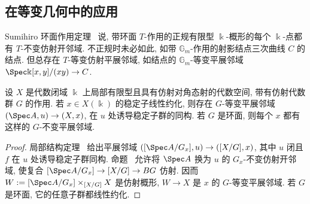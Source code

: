 \subsection{在等变几何中的应用}\label{src:7.7.7-subsection}
Sumihiro 环面作用定理~ 说, 带环面 $T$-作用的正规有限型 $\Bbbk$-概形的每个 $\Bbbk$-点都有 $T$-不变仿射开邻域. 不正规时未必如此, 如带 $\mathbb G_m$-作用的射影结点三次曲线 $C$ 的结点. 但总存在 $T$-等变仿射平展邻域, 如结点的 $\mathbb G_m$-等变平展邻域 $\Spec\Bbbk[x,y]/(xy)\to C$.
\begin{theorem}\label{src:7.7.24}
设 $X$ 是代数闭域 $\Bbbk$ 上局部有限型且具有仿射对角态射的代数空间, 带有仿射代数群 $G$ 的作用. 若 $x\in X(\Bbbk)$ 的稳定子线性约化, 则存在 $G$-等变平展邻域 $(\Spec A,u)\to(X,x)$, 在 $u$ 处诱导稳定子群的同构. 若 $G$ 是环面, 则每个 $x$ 都有这样的 $G$-不变平展邻域.
\end{theorem}
\begin{proof}
局部结构定理~ 给出平展邻域 $([\Spec A/G_x],u)\to([X/G],x)$, 其中 $u$ 闭且 $f$ 在 $u$ 处诱导稳定子群同构. 命题~ 允许将 $\Spec A$ 换为 $u$ 的 $G_x$-不变仿射开邻域, 使复合 $[\Spec A/G_x]\to[X/G]\to BG$ 仿射. 因而 $W:=[\Spec A/G_x]\times_{[X/G]}X$ 是仿射概形, $W\to X$ 是 $x$ 的 $G$-等变平展邻域. 若 $G$ 是环面, 它的任意子群都线性约化.
\end{proof}
